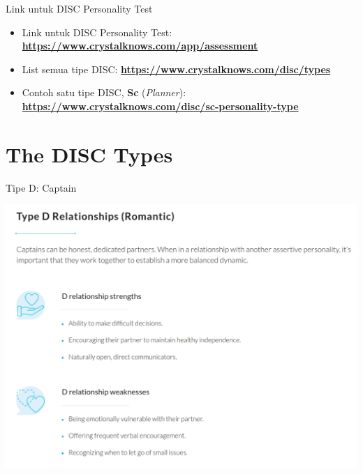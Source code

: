\documentclass{beamer}
\theoremstyle{mystyle}
\begin{document}
\begin{frame}{Link untuk DISC Personality Test}
	\begin{itemize}
		\item<2-> Link untuk DISC Personality Test: \textbf{\url{https://www.crystalknows.com/app/assessment}}
		
		\bigskip
 		\item<3-> List semua tipe DISC: \textbf{\url{https://www.crystalknows.com/disc/types}} 
		
		\bigskip
		\item<4-> Contoh satu tipe DISC, \textbf{Sc} (\textit{Planner}): \\
		\textbf{\url{https://www.crystalknows.com/disc/sc-personality-type}} 
	\end{itemize}
\end{frame}

\section{The DISC Types}
\begin{frame}{Tipe D: Captain}
	\begin{center}
		\includegraphics[scale=.275]{images/d}
	\end{center}
\end{frame}
\end{document}
